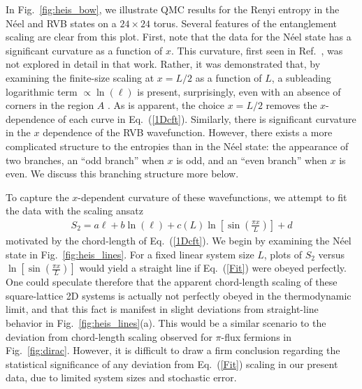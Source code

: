 \documentclass[prl,aps,twocolumn,floatfix,amsmath,amssymb,superscriptaddress,tightenlines]{revtex4}
\begin{document}
In Fig.~{\ref{fig:heis_bow}}, we illustrate QMC results for the Renyi entropy in the N\'eel and RVB states on a $24 \times 24$ torus.  
Several features of the entanglement scaling are clear from this plot.  First, note that the data for the N\'eel state has a significant curvature as a function of $x$.  This curvature, first seen in Ref.~\cite{HeisLog}, was not explored in detail in that work.  Rather, it was demonstrated that, by examining the finite-size scaling at $x=L/2$ as a function of $L$, a subleading logarithmic term $\propto \ln(\ell)$ is present, surprisingly, even with an absence of corners in the region $A$ \cite{MaxLog}.
As is apparent, the choice $x=L/2$ removes the $x$-dependence of each curve in Eq.~(\ref{1Dcft}).  
Similarly, there is significant curvature in the $x$ dependence of the RVB wavefunction.  However, there exists a more complicated structure to the entropies than in the N\'eel state: the appearance of two branches, an ``odd branch'' when $x$ is odd, and an ``even branch'' when $x$ is even.  We discuss this branching structure more below.

To capture the $x$-dependent curvature of these wavefunctions, we attempt to fit the data with the scaling ansatz
\begin{align}
S_2= a \ell + b\ln(\ell)
+ c(L) \ln \left[{ \sin\left({ \frac{\pi x}{L} }\right) }\right] + d \label{Fit}
\end{align}
motivated by the chord-length of Eq.~(\ref{1Dcft}).
We begin by examining the N\'eel state in Fig.~{\ref{fig:heis_lines}}.  For a fixed linear system size $L$, plots of $S_2$ versus $ \ln \left[{ \sin\left({ \frac{\pi x}{L} }\right) }\right] $ would yield a straight line if Eq.~(\ref{Fit}) were obeyed perfectly.  
One could speculate therefore that the apparent chord-length scaling of these square-lattice 2D systems is actually not perfectly obeyed in the thermodynamic limit, and that this fact is manifest in slight deviations from straight-line behavior in Fig.~{\ref{fig:heis_lines}}(a).
This would be a similar scenario to the deviation from chord-length scaling observed for $\pi$-flux fermions in Fig.~\ref{fig:dirac}.  
However, it is difficult to draw a firm conclusion regarding the statistical significance of any deviation from Eq.~(\ref{Fit}) scaling in our
present data, due to limited system sizes and stochastic error.
\end{document}
